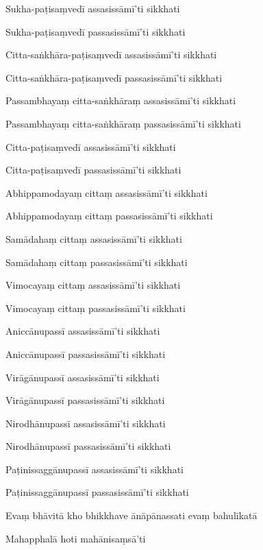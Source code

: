 Sukha-paṭisaṃvedī assasissāmī'ti sikkhati

Sukha-paṭisaṃvedī passasissāmī'ti sikkhati

Citta-saṅkhāra-paṭisaṃvedī assasissāmī'ti sikkhati

Citta-saṅkhāra-paṭisaṃvedī passasissāmī'ti sikkhati

Passambhayaṃ citta-saṅkhāraṃ assasissāmī'ti sikkhati

Passambhayaṃ citta-saṅkhāraṃ passasissāmī'ti sikkhati

Citta-paṭisaṃvedī assasissāmī'ti sikkhati

Citta-paṭisaṃvedī passasissāmī'ti sikkhati

Abhippamodayaṃ cittaṃ assasissāmī'ti sikkhati

Abhippamodayaṃ cittaṃ passasissāmī'ti sikkhati

Samādahaṃ cittaṃ assasissāmī'ti sikkhati

Samādahaṃ cittaṃ passasissāmī'ti sikkhati

Vimocayaṃ cittaṃ assasissāmī'ti sikkhati

Vimocayaṃ cittaṃ passasissāmī'ti sikkhati

Aniccānupassī assasissāmī'ti sikkhati

Aniccānupassī passasissāmī'ti sikkhati

Virāgānupassī assasissāmī'ti sikkhati

Virāgānupassī passasissāmī'ti sikkhati

Nirodhānupassī assasissāmī'ti sikkhati

Nirodhānupassī passasissāmī'ti sikkhati

Paṭinissaggānupassī assasissāmī'ti sikkhati

Paṭinissaggānupassī passasissāmī'ti sikkhati

Evaṃ bhāvitā kho bhikkhave ānāpānassati evaṃ bahulīkatā

Mahapphalā hoti mahānisaṃsā'ti



